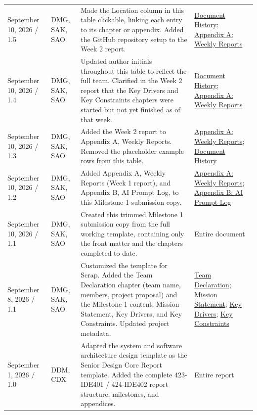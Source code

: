 \begin{tabularx}{\linewidth}{L{2.7cm}L{2.0cm}YL{2.4cm}}
September 10, 2026 / 1.5 & DMG, SAK, SAO & Made the Location column in this table clickable, linking each entry to its chapter or appendix. Added the GitHub repository setup to the Week 2 report. & \hyperref[Chapter:DocumentHistory]{Document History}; \hyperref[Chapter:WeeklyReports]{Appendix A: Weekly Reports}\\
September 10, 2026 / 1.4 & DMG, SAK, SAO & Updated author initials throughout this table to reflect the full team. Clarified in the Week 2 report that the Key Drivers and Key Constraints chapters were started but not yet finished as of that week. & \hyperref[Chapter:DocumentHistory]{Document History}; \hyperref[Chapter:WeeklyReports]{Appendix A: Weekly Reports}\\
September 10, 2026 / 1.3 & DMG, SAK, SAO & Added the Week 2 report to Appendix A, Weekly Reports. Removed the placeholder example rows from this table. & \hyperref[Chapter:WeeklyReports]{Appendix A: Weekly Reports}; \hyperref[Chapter:DocumentHistory]{Document History}\\
September 10, 2026 / 1.2 & DMG, SAK, SAO & Added Appendix A, Weekly Reports (Week 1 report), and Appendix B, AI Prompt Log, to this Milestone 1 submission copy. & \hyperref[Chapter:WeeklyReports]{Appendix A: Weekly Reports}; \hyperref[Chapter:AIPromptLog]{Appendix B: AI Prompt Log}\\
September 10, 2026 / 1.1 & DMG, SAK, SAO & Created this trimmed Milestone 1 submission copy from the full working template, containing only the front matter and the chapters completed to date. & Entire document\\
September 8, 2026 / 1.1 & DMG, SAK, SAO & Customized the template for Scrap. Added the Team Declaration chapter (team name, members, project proposal) and the Milestone 1 content: Mission Statement, Key Drivers, and Key Constraints. Updated project metadata. & \hyperref[Chapter:TeamDeclaration]{Team Declaration}; \hyperref[Chapter:MissionStatement]{Mission Statement}; \hyperref[Chapter:KeyDrivers]{Key Drivers}; \hyperref[Chapter:KeyConstraints]{Key Constraints}\\
September 1, 2026 / 1.0 & DDM, CDX & Adapted the system and software architecture design template as the Senior Design Core Report template. Added the complete 423-IDE401 / 424-IDE402 report structure, milestones, and appendices. & Entire report\\
\end{tabularx}
